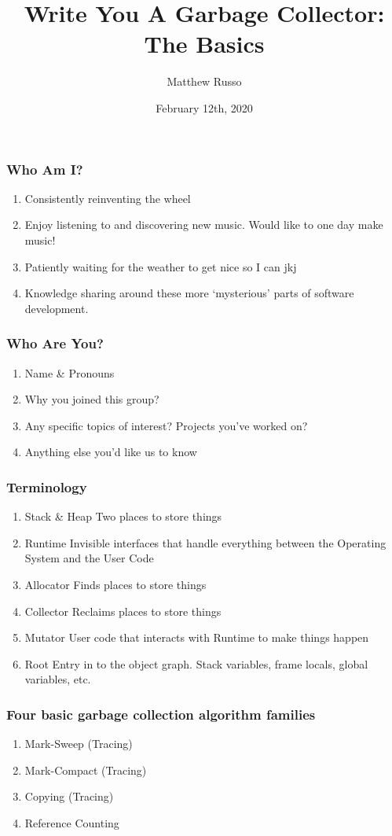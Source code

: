 \documentclass{beamer}
\title{Write You A Garbage Collector: The Basics}
\author{Matthew Russo}
\institute{Reinventing the Wheel}
\date{February 12th, 2020}
\begin{document}
 
\frame{\titlepage}

\begin{frame}
  \frametitle{Who Am I?}
  \begin{enumerate}
    \item Consistently reinventing the wheel
    \item Enjoy listening to and discovering new music. Would like to one day make music!
    \item Patiently waiting for the weather to get nice so I can jkj
    \item Knowledge sharing around these more `mysterious' parts of software development.
  \end{enumerate}
\end{frame}

\begin{frame}
  \frametitle{Who Are You?}
  \begin{enumerate}
    \item Name \& Pronouns
    \item Why you joined this group?
    \item Any specific topics of interest? Projects you've worked on?
    \item Anything else you'd like us to know
  \end{enumerate}
\end{frame}

\begin{frame}
  \frametitle{Terminology}
  \begin{enumerate}
    \item Stack \& Heap \textendash{} Two places to store things
    \item Runtime \textendash{} Invisible interfaces that handle everything between the Operating System and the User Code
    \item Allocator \textendash{} Finds places to store things
    \item Collector \textendash{} Reclaims places to store things
    \item Mutator \textendash{} User code that interacts with Runtime to make things happen
    \item Root \textendash{} Entry in to the object graph. Stack variables, frame locals, global variables, etc.
  \end{enumerate}
\end{frame}

\begin{frame}
  \frametitle{Four basic garbage collection algorithm families}
  \begin{enumerate}
    \item Mark-Sweep (Tracing)
    \item Mark-Compact (Tracing)
    \item Copying (Tracing)
    \item Reference Counting
  \end{enumerate}
\end{frame}
\end{document}

